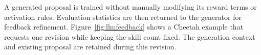\documentclass[conference,letterpaper,10pt]{IEEEtran}
\begin{document}
A generated proposal is trained without manually modifying its reward terms or activation rules. Evaluation statistics are then returned to the generator for feedback refinement. Figure~\ref{fig:llmfeedback} shows a Cheetah example that requests one revision while keeping the skill count fixed. The generation context and existing proposal are retained during this revision.

\begin{figure}[!t]
\centering
\setlength{\fboxsep}{8pt}

\end{figure}
\end{document}

